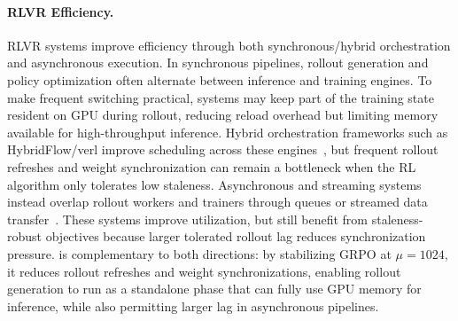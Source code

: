 \paragraph{RLVR Efficiency.}
RLVR systems improve efficiency through both synchronous/hybrid orchestration and
asynchronous execution. In synchronous pipelines, rollout generation and policy
optimization often alternate between inference and training engines. To make
frequent switching practical, systems may keep part of the training state
resident on GPU during rollout, reducing reload overhead but limiting memory
available for high-throughput inference. Hybrid orchestration frameworks such as
HybridFlow/verl improve scheduling across these engines~\citep{sheng2025hybridflow,
slime_github}, but frequent rollout refreshes and weight synchronization can
remain a bottleneck when the RL algorithm only tolerates low staleness. Asynchronous and streaming systems instead overlap rollout workers and trainers
through queues or streamed data transfer~\citep{fu2025areal, zhong2025streamrl,
han2025asyncflow, noukhovitch2024asynchronous}. These systems improve utilization,
but still benefit from staleness-robust objectives because larger tolerated
rollout lag reduces synchronization pressure. \ourmethod{} is complementary to
both directions: by stabilizing GRPO at $\mu=1024$, it reduces rollout refreshes
and weight synchronizations, enabling rollout generation to run as a standalone
phase that can fully use GPU memory for inference, while also permitting larger
lag in asynchronous pipelines.